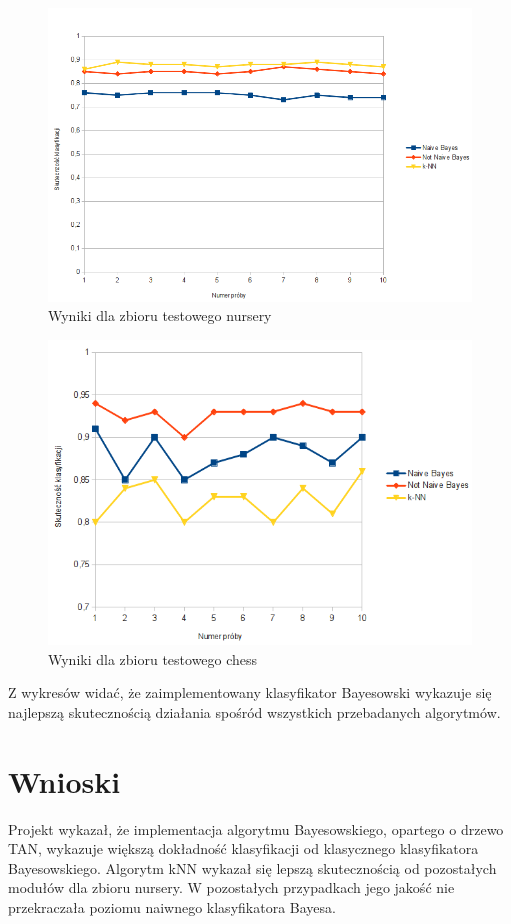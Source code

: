 \documentclass[paper=a4, fontsize=11pt]{scrartcl} %
\numberwithin{equation}{section} %
\numberwithin{figure}{section} %
\numberwithin{table}{section} %
\begin{document}
\begin{figure}[h]
 \centering
\includegraphics[width=150mm]{nursery.png}
 \caption{Wyniki dla zbioru testowego nursery}
 \label{fig:model_drzewa}
\end{figure}

\begin{figure}[h]
 \centering
\includegraphics[width=150mm]{chess.png}
 \caption{Wyniki dla zbioru testowego chess}
 \label{fig:model_drzewa}
\end{figure}

Z wykresów widać, że zaimplementowany klasyfikator Bayesowski wykazuje się najlepszą skutecznością działania spośród wszystkich przebadanych algorytmów. 

\section{Wnioski}
Projekt wykazał, że implementacja algorytmu Bayesowskiego, opartego o drzewo TAN, wykazuje większą dokładność klasyfikacji od klasycznego klasyfikatora Bayesowskiego. Algorytm kNN wykazał się lepszą skutecznością od pozostałych modułów dla zbioru nursery. W pozostałych przypadkach jego jakość nie przekraczała poziomu naiwnego klasyfikatora Bayesa.
\newpage


 
\end{document}
